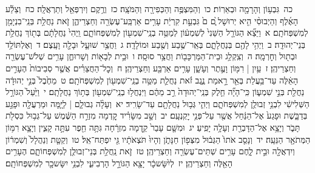 \documentclass[18pt]{article}
\begin{document}
 {\loc כה~}גִּבְע֥וֹן וְהָרָמָ֖ה וּבְאֵרֽוֹת׃ \startlock
 {\loc כו~}וְהַמִּצְפֶּ֥ה וְהַכְּפִירָ֖ה וְהַמֹּצָֽה׃ \startlock
 {\loc כז~}וְרֶ֥קֶם וְיִרְפְּאֵ֖ל וְתַרְאֲלָֽה׃ \startlock
 {\loc כח~}וְצֵלַ֡ע הָאֶ֜לֶף וְהַיְבוּסִ֨י הִ֤יא יְרוּשָׁל ַ֙͏ְם ם֙ גִּבְעַ֣ת קִרְיַ֔ת עָרִ֥ים אַרְבַּֽע־עֶשְׂרֵ֖ה וְחַצְרֵיהֶ֑ן זֹ֛את נַחֲלַ֥ת בְּנֵֽי־בִנְיָמִ֖ן לְמִשְׁפְּחֹתָֽם׃ 
\startlock
 {\loc א~}וַיֵּצֵ֞א הַגּוֹרָ֤ל הַשֵּׁנִי֙ לְשִׁמְע֔וֹן לְמַטֵּ֥ה בְנֵֽי־שִׁמְע֖וֹן לְמִשְׁפְּחוֹתָ֑ם וַֽיְהִי֙ נַחֲלָתָ֔ם בְּת֖וֹךְ נַחֲלַ֥ת בְּנֵי־יְהוּדָֽה׃ \startlock
 {\loc ב~}וַיְהִ֥י לָהֶ֖ם בְּנַחֲלָתָ֑ם בְּאֵֽר־שֶׁ֥בַע וְשֶׁ֖בַע וּמוֹלָדָֽה׃ \startlock
 {\loc ג~}וַחֲצַ֥ר שׁוּעָ֛ל וּבָלָ֖ה וָעָֽצֶם׃ \startlock
 {\loc ד~}וְאֶלְתּוֹלַ֥ד וּבְת֖וּל וְחׇרְמָֽה׃ \startlock
 {\loc ה~}וְצִֽקְלַ֥ג וּבֵית־הַמַּרְכָּב֖וֹת וַחֲצַ֥ר סוּסָֽה׃ \startlock
 {\loc ו~}וּבֵ֥ית לְבָא֖וֹת וְשָׁרוּחֶ֑ן עָרִ֥ים שְׁלֹשׁ־עֶשְׂרֵ֖ה וְחַצְרֵיהֶֽן׃ \startlock
 {\loc ז~}עַ֥יִן  |  רִמּ֖וֹן וָעֶ֣תֶר וְעָשָׁ֑ן עָרִ֥ים אַרְבַּ֖ע וְחַצְרֵיהֶֽן׃ \startlock
 {\loc ח~}וְכׇל־הַחֲצֵרִ֗ים אֲשֶׁ֤ר סְבִיבוֹת֙ הֶעָרִ֣ים הָאֵ֔לֶּה עַד־בַּ֥עֲלַת בְּאֵ֖ר רָ֣אמַת נֶ֑גֶב זֹ֗את נַחֲלַ֛ת מַטֵּ֥ה בְנֵֽי־שִׁמְע֖וֹן לְמִשְׁפְּחֹתָֽם׃ \startlock
 {\loc ט~}מֵחֶ֙בֶל֙ בְּנֵ֣י יְהוּדָ֔ה נַחֲלַ֖ת בְּנֵ֣י שִׁמְע֑וֹן כִּֽי־הָיָ֞ה חֵ֤לֶק בְּנֵֽי־יְהוּדָה֙ רַ֣ב מֵהֶ֔ם וַיִּנְחֲל֥וּ בְנֵֽי־שִׁמְע֖וֹן בְּת֥וֹךְ נַחֲלָתָֽם׃ \startlock
 {\loc י~}וַיַּ֙עַל֙ הַגּוֹרָ֣ל הַשְּׁלִישִׁ֔י לִבְנֵ֥י זְבוּלֻ֖ן לְמִשְׁפְּחֹתָ֑ם וַיְהִ֛י גְּב֥וּל נַחֲלָתָ֖ם עַד־שָׂרִֽיד׃ \startlock
 {\loc יא~}וְעָלָ֨ה גְבוּלָ֧ם  |  לַיָּ֛מָּה וּמַרְעֲלָ֖ה וּפָגַ֣ע בְּדַבָּ֑שֶׁת וּפָגַע֙ אֶל־הַנַּ֔חַל אֲשֶׁ֖ר עַל־פְּנֵ֥י יׇקְנְעָֽם׃ \startlock
 {\loc יב~}וְשָׁ֣ב מִשָּׂרִ֗יד קֵ֚דְמָה מִזְרַ֣ח הַשֶּׁ֔מֶשׁ עַל־גְּב֥וּל כִּסְלֹ֖ת תָּבֹ֑ר וְיָצָ֥א אֶל־הַדָּבְרַ֖ת וְעָלָ֥ה יָפִֽיעַ׃ \startlock
 {\loc יג~}וּמִשָּׁ֤ם עָבַר֙ קֵ֣דְמָה מִזְרָ֔חָה גִּתָּ֥ה חֵ֖פֶר עִתָּ֣ה קָצִ֑ין וְיָצָ֛א רִמּ֥וֹן הַמְּתֹאָ֖ר הַנֵּעָֽה׃ \startlock
 {\loc יד~}וְנָסַ֤ב אֹתוֹ֙ הַגְּב֔וּל מִצְּפ֖וֹן חַנָּתֹ֑ן וְהָיוּ֙ תֹּצְאֹתָ֔יו גֵּ֖י יִפְתַּח־אֵֽל׃ \startlock
 {\loc טו~}וְקַטָּ֤ת וְנַהֲלָל֙ וְשִׁמְר֔וֹן וְיִדְאֲלָ֖ה וּבֵ֣ית לָ֑חֶם עָרִ֥ים שְׁתֵּים־עֶשְׂרֵ֖ה וְחַצְרֵיהֶֽן׃ \startlock
 {\loc טז~}זֹ֛את נַֽחֲלַ֥ת בְּנֵי־זְבוּלֻ֖ן לְמִשְׁפְּחוֹתָ֑ם הֶעָרִ֥ים הָאֵ֖לֶּה וְחַצְרֵיהֶֽן׃ \startlock
 {\loc יז~}לְיִ֨שָּׂשכָ֔ר יָצָ֖א הַגּוֹרָ֣ל הָרְבִיעִ֑י לִבְנֵ֥י יִשָּׂשכָ֖ר לְמִשְׁפְּחוֹתָֽם׃ \startlock
\end{document}
